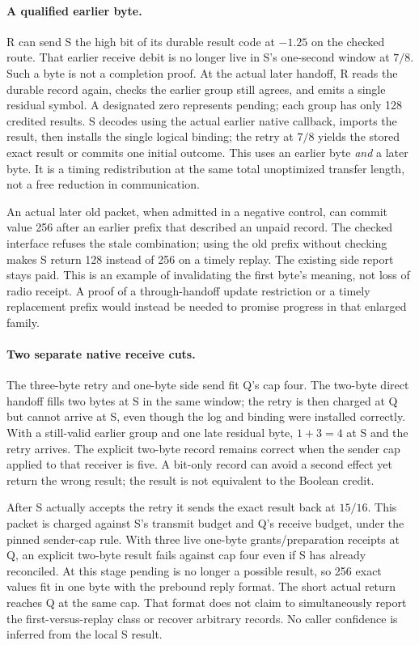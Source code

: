 \documentclass{article}
\begin{document}
\paragraph{A qualified earlier byte.}
R can send S the high bit of its durable result code at \(-1.25\) on
the checked route. That earlier receive debit is no longer live in
S's one-second window at \(7/8\). Such a byte is not a completion
proof. At the actual later handoff, R reads the durable record
again, checks the earlier group still agrees, and emits a
single residual symbol. A designated zero represents pending;
each group has only 128 credited results. S decodes using the actual
earlier native callback, imports the result, then installs the single
logical binding; the retry at \(7/8\) yields the stored exact result
or commits one initial outcome. This uses an earlier byte \emph{and}
a later byte. It is a timing redistribution at the same total
unoptimized transfer length, not a free reduction in communication.

An actual later old packet, when admitted in a negative control,
can commit value 256 after an earlier prefix that described an
unpaid record. The checked interface refuses the stale combination;
using the old prefix without checking makes S return 128 instead
of 256 on a timely replay. The existing side report stays paid.
This is an example of invalidating the first byte's meaning, not loss
of radio receipt. A proof of a through-handoff update restriction
or a timely replacement prefix would instead be needed to promise
progress in that enlarged family.

\paragraph{Two separate native receive cuts.}
The three-byte retry and one-byte side send fit Q's cap four.
The two-byte direct handoff fills two bytes at S in the same window;
the retry is then charged at Q but cannot arrive at S, even
though the log and binding were installed correctly.
With a still-valid earlier group and one late residual byte,
\(1+3=4\) at S and the retry arrives. The explicit two-byte
record remains correct when the sender cap applied to that
receiver is five. A bit-only record can avoid a second effect yet
return the wrong result; the result is not equivalent to the
Boolean credit.

After S actually accepts the retry it sends the exact result back
at \(15/16\). This packet is charged against S's transmit budget and
Q's receive budget, under the pinned sender-cap rule. With three live
one-byte grants/preparation receipts at Q, an explicit two-byte
result fails against cap four even if S has already reconciled.
At this stage pending is no longer a possible result, so 256
exact values fit in one byte with the prebound reply format. The
short actual return reaches Q at the same cap. That format does not
claim to simultaneously report the first-versus-replay class or
recover arbitrary records. No caller confidence is inferred from
the local S result.
\end{document}

